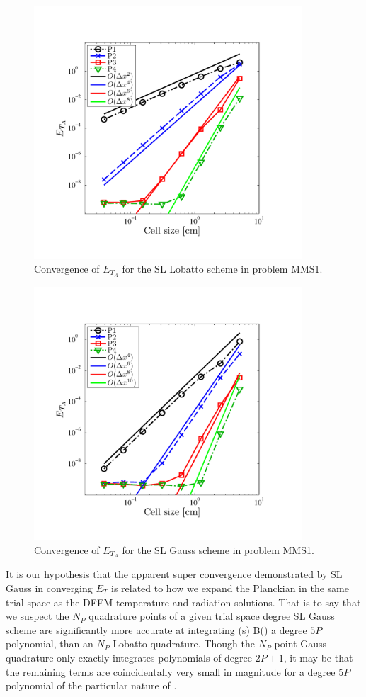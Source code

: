 \begin{figure}[!htp]
\centering
\includegraphics[width=10cm,trim=0.25in  0.5in 0.75in 0.75in,clip=true]{chapter6_grey_radtran/Dissertation_Data/MMS2_SLXS_Lobatto_temp_A.pdf}
\caption{Convergence of $E_{T_A}$ for the SL Lobatto scheme in problem MMS1.}
\label{fig:mms1_lobatto_temp_A}
\end{figure}
%
%
\begin{figure}[!hbp]
\centering
\includegraphics[width=10cm,trim=0.25in  0.5in 0.75in 0.75in,clip=true]{chapter6_grey_radtran/Dissertation_Data/MMS2_SLXS_Gauss_temp_A.pdf}
\caption{Convergence of $E_{T_A}$ for the SL Gauss scheme in problem MMS1.}
\label{fig:mms1_gauss_temp_A}
\end{figure}

It is our hypothesis that the apparent super convergence demonstrated by SL Gauss in converging $E_T$ is related to how we expand the Planckian in the same trial space as the DFEM temperature and radiation solutions. 
That is to say that we suspect the $N_P$ quadrature points of a given trial space degree SL Gauss scheme are significantly more accurate at integrating 
\benum
{}(s) B() \pec
\label{eq:planck_int}
\eenum
a degree $5P$ polynomial, than an $N_P$ Lobatto quadrature.
Though the $N_P$ point Gauss quadrature only exactly integrates polynomials of degree $2P+1$, it may be that the remaining terms are coincidentally very small in magnitude for a degree $5P$ polynomial of the particular nature of .

